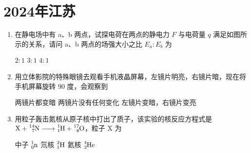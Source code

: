 \documentclass[\gkver]{gaokaozhenti}
\begin{document}
\chapter{2024年江苏}

\begin{enumerate}
\item
在静电场中有 a、b 两点，试探电荷在两点的静电力 $F$ 与电荷量 $q$ 满足如图所示的关系，请问 a、b 两点的场强大小之比 $E_{a}:E_{b}$ 为


{$2:1$}
{$3:1$}
{$4:1$}


\item
用立体影院的特殊眼镜去观看手机液晶屏幕，左镜片明亮，右镜片暗，现在将手机屏幕旋转 90 度，会观察到

{两镜片都变暗}
{两镜片没有任何变化}
{左镜片变暗，右镜片变亮}


\item
用粒子轰击氮核从原子核中打出了质子，该实验的核反应方程式是 $\ce{X + ^{14}_{7}N -> ^{1}_{1}H + ^{17}_{8}O}$，粒子 X 为

{中子 $\ce{^{1}_{0}n}$}
{氘核 $\ce{^{2}_{1}H}$}
{氦核 $\ce{^{4}_{2}He}$}

\end{enumerate}
\end{document}
